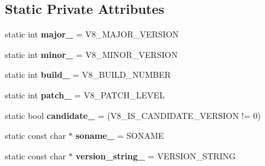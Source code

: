 \subsection*{Static Private Attributes}
\begin{DoxyCompactItemize}
\item 
static int {\bfseries major\+\_\+} = V8\+\_\+\+M\+A\+J\+O\+R\+\_\+\+V\+E\+R\+S\+I\+ON\hypertarget{classv8_1_1internal_1_1_version_aea21787b9eef6fd372e5133eaf5e3ccb}{}\label{classv8_1_1internal_1_1_version_aea21787b9eef6fd372e5133eaf5e3ccb}

\item 
static int {\bfseries minor\+\_\+} = V8\+\_\+\+M\+I\+N\+O\+R\+\_\+\+V\+E\+R\+S\+I\+ON\hypertarget{classv8_1_1internal_1_1_version_ad28878e7cebe076bc3089e0f93a66632}{}\label{classv8_1_1internal_1_1_version_ad28878e7cebe076bc3089e0f93a66632}

\item 
static int {\bfseries build\+\_\+} = V8\+\_\+\+B\+U\+I\+L\+D\+\_\+\+N\+U\+M\+B\+ER\hypertarget{classv8_1_1internal_1_1_version_a2b677e93973a9d941b6bbea7b287d101}{}\label{classv8_1_1internal_1_1_version_a2b677e93973a9d941b6bbea7b287d101}

\item 
static int {\bfseries patch\+\_\+} = V8\+\_\+\+P\+A\+T\+C\+H\+\_\+\+L\+E\+V\+EL\hypertarget{classv8_1_1internal_1_1_version_adfe5cc0116264137209342800e5dd12f}{}\label{classv8_1_1internal_1_1_version_adfe5cc0116264137209342800e5dd12f}

\item 
static bool {\bfseries candidate\+\_\+} = (V8\+\_\+\+I\+S\+\_\+\+C\+A\+N\+D\+I\+D\+A\+T\+E\+\_\+\+V\+E\+R\+S\+I\+ON != 0)\hypertarget{classv8_1_1internal_1_1_version_a91bb355c275afe4a0adf32a6e1b92b2f}{}\label{classv8_1_1internal_1_1_version_a91bb355c275afe4a0adf32a6e1b92b2f}

\item 
static const char $\ast$ {\bfseries soname\+\_\+} = S\+O\+N\+A\+ME\hypertarget{classv8_1_1internal_1_1_version_abc42c8d6b680757befe7929a2ae32d5c}{}\label{classv8_1_1internal_1_1_version_abc42c8d6b680757befe7929a2ae32d5c}

\item 
static const char $\ast$ {\bfseries version\+\_\+string\+\_\+} = V\+E\+R\+S\+I\+O\+N\+\_\+\+S\+T\+R\+I\+NG\hypertarget{classv8_1_1internal_1_1_version_aa15d52578423723e8e30b473725b8592}{}\label{classv8_1_1internal_1_1_version_aa15d52578423723e8e30b473725b8592}

\end{DoxyCompactItemize}
